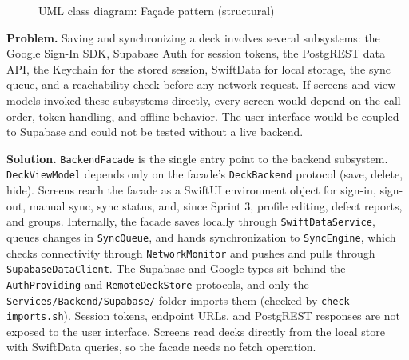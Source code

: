\documentclass[12pt,letterpaper]{article}
\newcommand{\st}[1]{\guillemotleft#1\guillemotright}   %
\begin{document}
\begin{figure}[!htbp]
{}
\caption{UML class diagram: Fa\c{c}ade pattern (structural)}
\label{fig:facade}
\end{figure}

\textbf{Problem.} Saving and synchronizing a deck involves several subsystems: the
Google Sign-In SDK, Supabase Auth for session tokens, the PostgREST data API, the
Keychain for the stored session, SwiftData for local storage, the sync queue, and a
reachability check before any network request. If screens and view models invoked these
subsystems directly, every screen would depend on the call order, token handling, and
offline behavior. The user interface would be coupled to Supabase and could not be
tested without a live backend.

\textbf{Solution.} \texttt{BackendFacade} is the single entry point to the backend
subsystem. \texttt{DeckViewModel} depends only on the facade's \texttt{DeckBackend}
protocol (save, delete, hide). Screens reach the facade as a SwiftUI environment object
for sign-in, sign-out, manual sync, sync status, and, since Sprint 3, profile editing,
defect reports, and groups. Internally, the facade saves
locally through \texttt{SwiftDataService}, queues changes in \texttt{SyncQueue}, and
hands synchronization to \texttt{SyncEngine}, which checks connectivity through
\texttt{NetworkMonitor} and pushes and pulls through \texttt{SupabaseDataClient}. The
Supabase and Google types sit behind the \texttt{AuthProviding} and
\texttt{RemoteDeckStore} protocols, and only the \texttt{Services/\allowbreak Backend/\allowbreak Supabase/}
folder imports them (checked by \texttt{check-imports.sh}). Session tokens, endpoint
URLs, and PostgREST responses are not exposed to the user interface. Screens read decks
directly from the local store with SwiftData queries, so the facade needs no fetch
operation.
\end{document}
